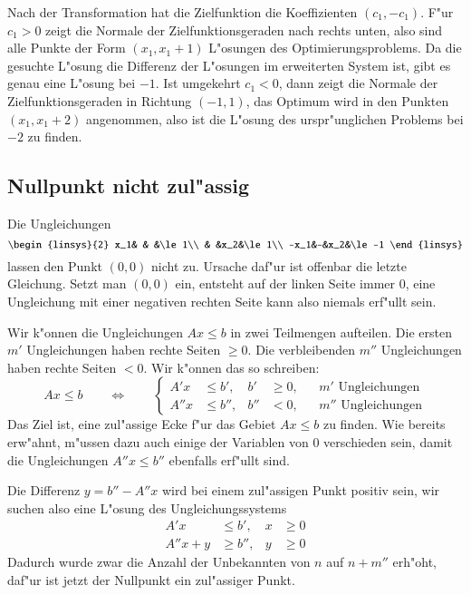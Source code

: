 Nach der Transformation hat die Zielfunktion die Koeffizienten
$(c_1,-c_1)$. F"ur $c_1>0$ zeigt die Normale der Zielfunktionsgeraden
nach rechts unten, also sind alle Punkte der Form $(x_1,x_1+1)$ L"osungen
des Optimierungsproblems. Da die gesuchte L"osung die Differenz der L"osungen
im erweiterten System ist, gibt es genau eine L"osung bei $-1$.
Ist umgekehrt $c_1 < 0$, dann zeigt die Normale der
Zielfunktionsgeraden in Richtung $(-1,1)$, das Optimum wird in den
Punkten $(x_1,x_1+2)$ angenommen, also ist die L"osung des urspr"unglichen
Problems bei $-2$ zu finden.

\subsection{Nullpunkt nicht zul"assig\label{lp:zero-not-admissible}}
Die Ungleichungen
\begin{equation}
\begin{linsys}{2}
 x_1& &   &\le 1\\
    & &x_2&\le 1\\
-x_1&-&x_2&\le -1
\end{linsys}
\label{lp:zero-not-admissible-example}
\end{equation}
lassen den Punkt $(0,0)$ nicht zu. Ursache daf"ur ist offenbar die letzte
Gleichung. Setzt man $(0,0)$ ein, entsteht auf der linken Seite immer $0$,
eine Ungleichung mit einer negativen rechten Seite kann also niemals
erf"ullt sein.

Wir k"onnen die Ungleichungen $Ax\le b$ in zwei Teilmengen aufteilen.
Die ersten $m'$ Ungleichungen haben rechte Seiten $\ge 0$. Die 
verbleibenden $m''$ Ungleichungen haben rechte Seiten $<0$. Wir k"onnen
das so schreiben:
\begin{equation}
Ax\le b \qquad\Leftrightarrow\qquad
\left\{
\begin{aligned}
 A'x&\le b',  &b'&\ge 0,&&\text{$m'$ Ungleichungen}\\
A''x&\le b'', &b''& < 0,&&\text{$m''$ Ungleichungen}
\end{aligned}
\right.
\end{equation}
Das Ziel ist, eine zul"assige Ecke f"ur das Gebiet $Ax\le b$ zu finden.
Wie bereits erw"ahnt, m"ussen dazu auch einige der Variablen von $0$
verschieden sein, damit die Ungleichungen $A''x\le b''$ ebenfalls erf"ullt
sind.

Die Differenz $y=b''-A''x$ wird bei einem zul"assigen Punkt positiv sein,
wir suchen also eine L"osung des Ungleichungssystems
\begin{equation}
\begin{aligned}
A'x&\le b',&x&\ge 0\\
A''x+y&\ge b'',&y&\ge 0
\end{aligned}
\label{lp:first-corner-extended}
\end{equation}
Dadurch wurde zwar die Anzahl der Unbekannten von $n$ auf $n+m''$ erh"oht,
daf"ur ist jetzt der Nullpunkt ein zul"assiger Punkt.

